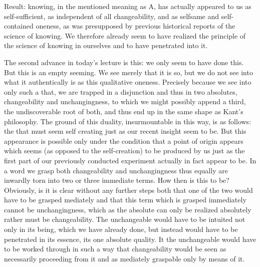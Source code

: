 \documentclass{article}
\begin{document}
Result: knowing, in the mentioned meaning as A, has actually appeared to us
as self-sufficient, as independent of all changeability,
and as selfsame and self-contained oneness,
as was presupposed by previous historical reports of the science of knowing.
We therefore already seem to have realized the principle of 
the science of knowing in ourselves  and to have penetrated into it.

The second advance in today's lecture is this:
we only seem to have done this.
But this is an empty seeming.
We see merely that it is so,
but we do not see into what it authentically is as this qualitative oneness.
Precisely because we see into only such a that,
we are trapped in a disjunction
and thus in two absolutes, changeability and unchangingness,
to which we might possibly append a third, the undiscoverable root of both,
and thus end up in the same shape as Kant's philosophy.
The ground of this duality, insurmountable in this way, is as follows:
the that must seem self creating just as our recent insight seem to be.
But this appearance is possible only under the condition
that a point of origin appears which seems (as opposed to 
the self-creation) to be produced by us
just as the first part of our previously conducted experiment
actually in fact appear to be.
In a word we grasp both changeability and unchangingness 
thus equally are inwardly torn into two or three immediate terms.
How then is this to be?
Obviously, is it is clear without any further steps
both that one of the two would have to be grasped mediately 
and that this term which is grasped immediately cannot be unchangingness,
which as the absolute can only be realized absolutely
rather must be changeability.
The unchangeable would have to be intuited
not only in its being, which we have already done, 
but instead would have to be penetrated in its essence,
its one absolute quality.
It the unchangeable would have to be worked through
in such a way that changeability would be seen
as necessarily proceeding from it
and as mediately graspable only by means of it.
\end{document}
